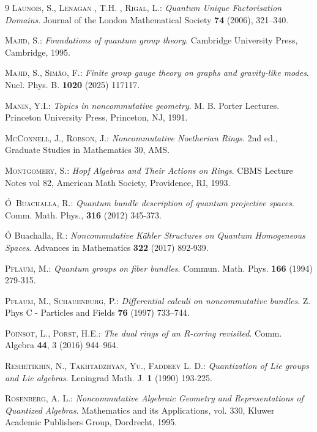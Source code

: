 \documentclass{article}
\theoremstyle{definition}
\begin{document}
{\begin{thebibliography}{9}
	\textsc{Launois, S., Lenagan , T.H. ,  Rigal, L.:} \emph{
		Quantum Unique Factorisation Domains}.
	Journal of the London Mathematical Society \textbf{74} (2006), 321–340.
	
	\textsc{Majid, S.:}
	\textit{Foundations of quantum group theory}. 
	Cambridge University Press, Cambridge, 1995.
	
	\textsc{Majid, S., Sim\~ao, F.:}
	\textit{Finite group gauge theory on graphs and gravity-like modes}.
	Nucl. Phys. B. \textbf{1020} (2025) 117117.
	
	\textsc{Manin, Y.I.:}
	\textit{Topics in noncommutative geometry}.
	M. B. Porter Lectures. Princeton University Press, Princeton, NJ, 1991.
	
	\textsc{McConnell, J., Robson, J.:}
	\textit{Noncommutative Noetherian Rings}.
	2nd ed., Graduate Studies in Mathematics 30, AMS.
	
	\textsc{Montgomery, S.:}
	\textit{Hopf Algebras and Their Actions on Rings}.
	CBMS Lecture Notes vol 82, American Math Society, Providence, RI, 1993.
	
	\textsc{\'O~Buachalla, R.:}
	\textit{Quantum bundle description of quantum projective spaces}. 
	Comm. Math. Phys., \textbf{316}  (2012) 345-373.
	
	  {\'O Buachalla, R.:} 
	\textit{Noncommutative Kähler Structures on Quantum Homogeneous Spaces}.
	Advances in Mathematics \textbf{322} (2017) 892-939.
	
	
	\textsc{Pflaum, M.:} 
	\textit{Quantum groups on fiber bundles}. 
	Commun. Math. Phys. \textbf{166} (1994) 279-315.
	
	\textsc{Pflaum, M., Schauenburg, P.:} 
	\textit{Differential calculi on noncommutative bundles}.
	Z. Phys C - Particles and Fields \textbf{76} (1997) 733–744.
	
	\textsc{Poinsot, L., Porst, H.E.:}
	\emph{ The dual rings of an R-coring revisited}.
	Comm. Algebra \textbf{44}, 3 (2016) 944–964.
	
	\textsc{Reshetikhin, N., Takhtadzhyan, Yu., Faddeev L. D.:}
	\textit{Quantization of Lie groups and Lie algebras}. 
	Leningrad Math. J. \textbf{1} (1990) 193-225.
	
	
	
	
	 \textsc{Rosenberg, A. L.:} 
	\textit{Noncommutative Algebraic Geometry and Representations 
		of Quantized Algebras}. Mathematics and its Applications, vol. 330, Kluwer
	Academic Publishers Group, Dordrecht, 1995.
	

\end{thebibliography}}
\end{document}

